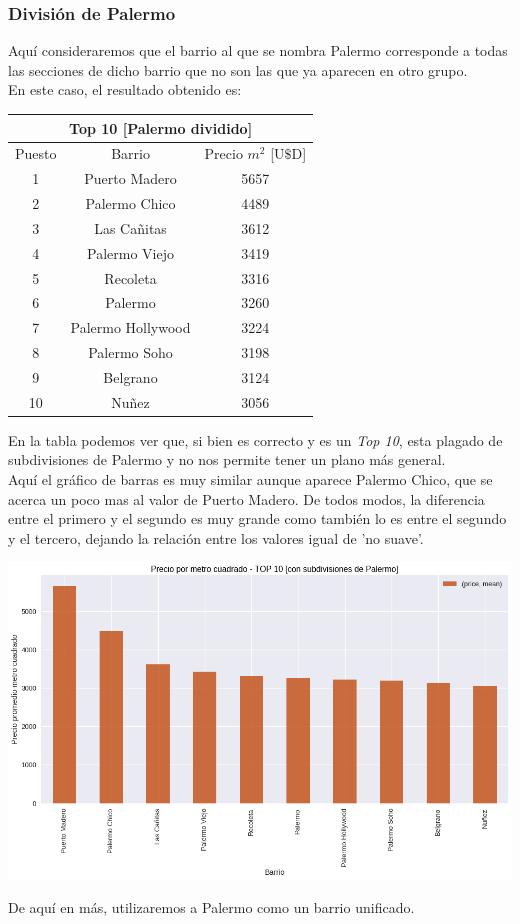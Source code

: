 \documentclass[a4paper, 10pt]{article}
\newcommand\tab[1][0.5cm]{\hspace*{#1}}
\begin{document}
			  	\subsubsection{División de Palermo}
			  		Aquí consideraremos que el barrio al que se nombra Palermo corresponde a todas las secciones de dicho
			  		barrio que no son las que ya aparecen en otro grupo. \\
			  		\tab En este caso, el resultado obtenido es:
			  		\begin{center}
						\begin{tabular}{ |c|c|c| }
							\hline
							\multicolumn{3}{|c|}{Top 10 [Palermo dividido]}\\
							\hline
							\hline
							Puesto & Barrio & Precio $m^2$ [U$\$$D] \\
							\hline
							1 & Puerto Madero & 5657 \\
							2 & Palermo Chico & 4489 \\
							3 & Las Cañitas & 3612  \\
							4 & Palermo Viejo & 3419 \\
							5 & Recoleta & 3316 \\
							6 & Palermo & 3260 \\
							7 & Palermo Hollywood & 3224 \\
							8 & Palermo Soho & 3198 \\
							9 & Belgrano & 3124 \\
							10 & Nuñez & 3056 \\
							\hline
						\end{tabular}
					\end{center}
					\tab En la tabla podemos ver que, si bien es correcto y es un \emph{Top 10}, esta plagado de subdivisiones
					de Palermo y no nos permite tener un plano más general. \\
					\tab Aquí el gráfico de barras es muy similar aunque aparece Palermo Chico, que se acerca un poco mas
					al valor de Puerto Madero. De todos modos, la diferencia entre el primero y el segundo es muy grande
					como también lo es entre el segundo y el tercero, dejando la relación entre los valores igual de 'no suave'.
					\begin{center}
   	    					\includegraphics[width=\textwidth]{images/m2NotUnifiedTop10}
			  		\end{center}
			  		\tab De aquí en más, utilizaremos a Palermo como un barrio unificado.
\end{document}
